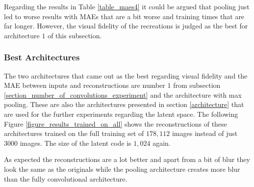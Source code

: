 Regarding the results in Table \ref{table_maes4} it could be argued that pooling just led to worse results with
MAEs that are a bit worse and training times that are far longer. However, the visual fidelity of the recreations
is judged as the best for architecture $1$ of this subsection.


\subsubsection{Best Architectures}

The two architectures that came out as the best regarding visual fidelity and the MAE between inputs and 
reconstructions are number $1$ from subsection \ref{section_number_of_convolutions_experiment} and the architecture
with max pooling. These are also the architectures presented in section \ref{architecture} that are used
for the further experiments regarding the latent space. The following Figure \ref{figure_results_trained_on_all}
shows the reconstructions of these architectures trained on the full training set of $178,112$ images instead
of just $3000$ images. The size of the latent code is $1,024$ again.

As expected the reconstructions are a lot better and apart from a bit of blur they look the same as the originals
while the pooling architecture creates more blur than the fully convolutional architecture.


